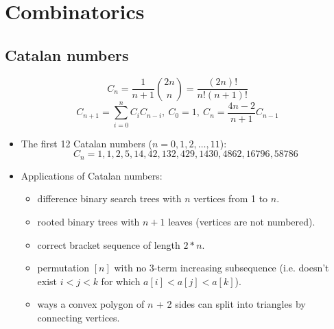 \section{Combinatorics}
\subsection{Catalan numbers}
\[ C_n = \frac{1}{n + 1} {2n \choose n} = \frac{(2n)!}{n!(n+1)!}\]
\[ C_{n + 1} = \displaystyle\sum_{i = 0}^{n}C_i C_{n - i},\ C_0 = 1,\ C_n = \frac{4n - 2}{n + 1}C_{n - 1}\]
\begin{itemize}
  \item The first 12 Catalan numbers ($n = 0, 1, 2, \ldots, 11$):
  \[ C_n = 1, 1, 2, 5, 14, 42, 132, 429, 1430, 4862, 16796, 58786 \]
  \item Applications of Catalan numbers:
  \begin{itemize}
    \item difference binary search trees with $n$ vertices from 1 to $n$.
    \item rooted binary trees with $n + 1$ leaves (vertices are not numbered).
    \item correct bracket sequence of length $2 * n$.
    \item permutation $[n]$ with no 3-term increasing subsequence (i.e. doesn't exist $i < j < k$ for which $a[i] < a[j] < a[k]$).
    \item ways a convex polygon of $n$ + 2 sides can split into triangles by connecting vertices.
  \end{itemize}
\end{itemize}

